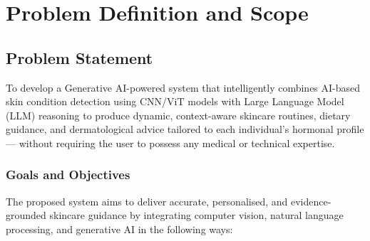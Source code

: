\chapter{Problem Definition and Scope}
\section{Problem Statement}
\hspace*{0.5in}To develop a Generative AI-powered system that intelligently combines AI-based skin condition detection using CNN/ViT models with Large Language Model (LLM) reasoning to produce dynamic, context-aware skincare routines, dietary guidance, and dermatological advice tailored to each individual's hormonal profile — without requiring the user to possess any medical or technical expertise.\\

\subsection{Goals and Objectives}
\hspace*{0.5in}The proposed system aims to deliver accurate, personalised, and evidence-grounded skincare guidance by integrating computer vision, natural language processing, and generative AI in the following ways:

